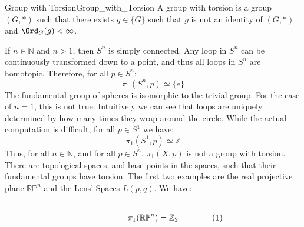             \begin{ldefinition}{Group with Torsion}{Group_with_Torsion}
                A group with torsion is a group $(G,*)$ such that
                there exists $g\in\{G\}$ such that $g$ is not an identity
                of $(G,*)$ and $\Ord_{G}(g)<\infty$.
            \end{ldefinition}
            \begin{lexample}{}{}
                If $n\in\mathbb{N}$ and $n>1$, then $S^{n}$ is simply connected.
                Any loop in $S^{n}$ can be continuously transformed down to a
                point, and thus all loops in $S^{n}$ are homotopic. Therefore, for
                all $p\in{S}^{n}$:
                \begin{equation}
                    \pi_{1}(S^{n},p)\simeq\{e\}
                \end{equation}
                The fundamental group of spheres is isomorphic to the trivial group.
                For the case of $n=1$, this is not true. Intuitively we can see
                that loops are uniquely determined by how many times they wrap around
                the circle. While the actual computation is difficult, for all
                $p\in{S}^{1}$ we have:
                \begin{equation}
                    \pi_{1}(S^{1},p)\simeq\mathbb{Z}
                \end{equation}
                Thus, for all $n\in\mathbb{N}$, and for all $p\in{S}^{n}$,
                $\pi_{1}(X,p)$ is not a group with torsion. There are
                topological spaces, and base points in the spaces, such that
                their fundamental groups have torsion. The first two examples
                are the real projective plane $\mathbb{RP}^{n}$ and the Lens'
                Spaces
                $L(p,q)$. We have:
                \par
                \begin{subequations}
                    \begin{minipage}[b]{0.49\textwidth}
                        \centering
                        \begin{equation}
                            \pi_{1}(\mathbb{RP}^{n})
                            =\mathbb{Z}_{2}
                        \end{equation}
                    \end{minipage}
                    \hfill
                    \begin{minipage}[b]{0.49\textwidth}

\end{minipage}
\end{subequations}
\end{lexample}
